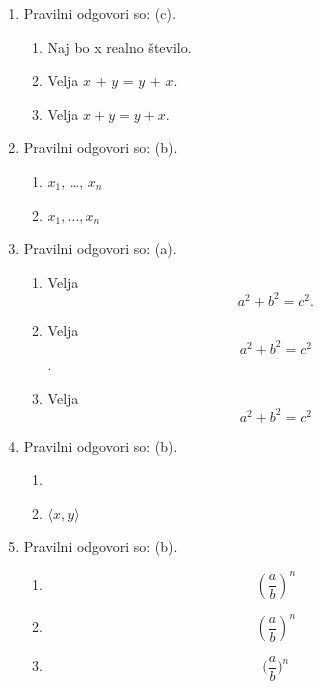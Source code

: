 \documentclass[11pt]{article}
\begin{document}
\begin{enumerate}
    \item Pravilni odgovori so: (c).%
    \begin{enumerate}
        \item Naj bo x realno število.
        \item Velja \(x\) + \(y\) = \(y\) + \(x\).
        \item Velja \(x + y = y + x\).
    \end{enumerate}

    \item Pravilni odgovori so: (b).%
    \begin{enumerate}
        \item \(x_1\), \dots, \(x_n\)
        \item \(x_1, \ldots, x_n\)
    \end{enumerate}

    \item Pravilni odgovori so: (a).%
    \begin{enumerate}
        \item
Velja
\[
  a^2 + b^2 = c^2.
\]
        \item
Velja
\[
  a^2 + b^2 = c^2
\]
.
        \item
Velja
\[
  a^2 + b^2 = c^2
\]
    \end{enumerate}

    \item Pravilni odgovori so: (b).%
    \begin{enumerate}
        \item \(<x, y>\)
        \item \(\langle x, y \rangle\)
    \end{enumerate}

    \item Pravilni odgovori so: (b).%
    \begin{enumerate}
        \item \[ (\frac{a}{b})^n \]
        \item \[ \left(\frac{a}{b}\right)^n \]
        \item \[ \Big(\frac{a}{b}\Big)^n \]
    \end{enumerate}


\end{enumerate}
\end{document}
